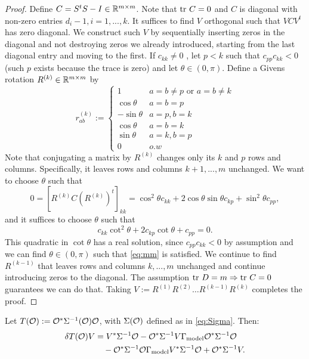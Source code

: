 \documentclass{amsart}
\numberwithin{equation}{section}
\begin{document}
\begin{proof}
  Define $C = S^tS - I \in \mathbb{R}^{m \times m}$. Note that $\textup{tr}\  C = 0$ and
  $C$ is diagonal with non-zero entries $d_i-1,i=1,...,k$. It suffices
  to find $V$ orthogonal such that $V C V^t$ has zero diagonal. We
  construct such $V$ by sequentially inserting zeros in the diagonal
  and not destroying zeros we already introduced, starting from the
  last diagonal entry and moving to the first. If $c_{kk} \neq 0$ ,
  let $p < k$ such that $c_{pp}c_{kk} < 0$ (such $p$ exists because
  the trace is zero) and let $\theta \in (0,\pi)$. Define a Givens
  rotation $R^{(k)} \in \mathbb{R}^{m \times m}$ by
  \begin{equation*}
    r^{(k)}_{ab} :=
    \begin{cases}
      1 & a = b \neq p \text{ or } a = b \neq k \\
      \cos \theta & a = b = p  \\
     -\sin \theta & a = p, b = k\\
      \cos \theta & a = b = k \\
      \sin \theta & a = k, b = p \\ 
      0 & o.w
    \end{cases}
  \end{equation*}
  Note that conjugating a matrix by $R^{(k)}$ changes only its $k$ and
  $p$ rows and columns. Specifically, it leaves rows and columns
  $k+1,...,m$ unchanged. We want to choose $\theta$ such that
  \begin{equation}\label{eq:mm}
    0 = [R^{(k)} C (R^{(k)})^t]_{kk} = \cos^2 \theta c_{kk} + 2\cos \theta \sin
    \theta c_{kp} + \sin^2\theta c_{pp},
  \end{equation}
  and it suffices to choose $\theta$ such that
  \begin{equation*}
    c_{kk} \cot^2 \theta + 2 c_{kp} \cot \theta + c_{pp} = 0.
  \end{equation*}
  This quadratic in $\cot\theta$ has a real solution, since
  $c_{pp}c_{kk} < 0$ by assumption and we can find $\theta \in
  (0,\pi)$ such that \eqref{eq:mm} is satisfied. We continue to find
  $R^{(k-1)}$ that leaves rows and columns $k,...,m$ unchanged and
  continue introducing zeros to the diagonal. The assumption $\textup{tr}\  D =
  m \Rightarrow \textup{tr}\  C = 0$ guarantees we can do that. Taking $V:=
  R^{(1)} R^{(2)} \dots R^{(k-1)}R^{(k)}$ completes the proof.
\end{proof}

\begin{lemma}\label{lemma:aux calc}
  Let $T(\mathcal{O}) := \mathcal{O}^* \Sigma^{-1}(\mathcal{O})\mathcal{O}$, with $\Sigma(\mathcal{O})$
  defined as in \eqref{eq:Sigma}. Then:
  \begin{align*}
    \delta T(\mathcal{O})V &= V^* \Sigma^{-1} \mathcal{O} 
    - \mathcal{O}^*\Sigma^{-1} V\Gamma_{\textup{model}} \mathcal{O}^* \Sigma^{-1}\mathcal{O} \\
    &\ \ \ - \mathcal{O}^* \Sigma^{-1} \mathcal{O} \Gamma_{\textup{model}} V^* \Sigma^{-1}\mathcal{O}
    + \mathcal{O}^* \Sigma^{-1} V.
  \end{align*}
\end{lemma}
\end{document}
